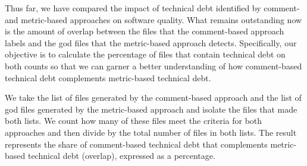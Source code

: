 {
Thus far, we have compared the impact of technical debt identified by comment- and metric-based approaches on software quality. What remains outstanding now is the amount of overlap between the \SATD files that the comment-based approach labels and the god files that the metric-based approach detects. Specifically, our objective is to calculate the percentage of files that contain technical debt on both counts so that we can garner a better understanding of how comment-based technical debt complements metric-based technical debt.


We take the list of \SATD files generated by the comment-based approach and the list of god files generated by the metric-based approach and isolate the files that made both lists. We count how many of these files meet the criteria for both approaches and then divide by the total number of files in both lists. The result represents the share of comment-based technical debt that complements metric-based technical debt (overlap), expressed as a percentage.


	\begin{table}[!htbp]
	\small
	\centering
	

\end{table}}
